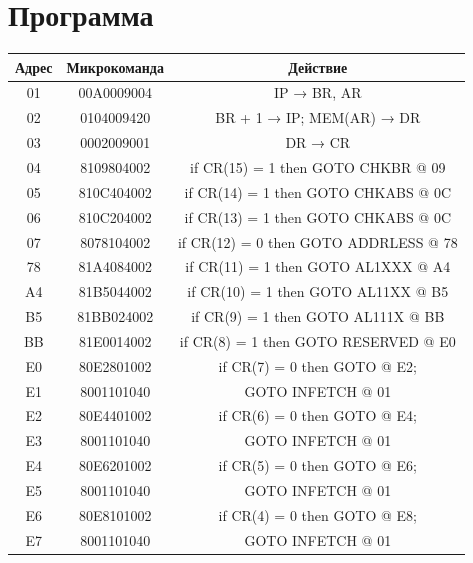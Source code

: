 \section{Программа}
\begin{center}
    \begin{tabular}{|c|c|c|}
        \hline
        Адрес   & Микрокоманда & Действие   \\
        \hline
        01  & 00A0009004    & IP → BR, AR   \\
        \hline
        02  & 0104009420    & BR + 1 → IP; MEM(AR) → DR \\
        \hline
        03  & 0002009001    & DR → CR   \\
        \hline
        04  & 8109804002    & if CR(15) = 1 then GOTO CHKBR @ 09    \\
        \hline
        05  & 810C404002    & if CR(14) = 1 then GOTO CHKABS @ 0C   \\
        \hline
        06  & 810C204002    & if CR(13) = 1 then GOTO CHKABS @ 0C   \\
        \hline
        07  & 8078104002    & if CR(12) = 0 then GOTO ADDRLESS @ 78 \\
        \hline
        78  & 81A4084002    & if CR(11) = 1 then GOTO AL1XXX @ A4   \\
        \hline
        A4  & 81B5044002    & if CR(10) = 1 then GOTO AL11XX @ B5   \\
        \hline
        B5  & 81BB024002    & if CR(9) = 1 then GOTO AL111X @ BB    \\
        \hline
        BB  & 81E0014002    & if CR(8) = 1 then GOTO RESERVED @ E0  \\
        \hline
        E0  & 80E2801002    & if CR(7) = 0 then GOTO @ E2; \\
        \hline
        E1  & 8001101040    & GOTO INFETCH @ 01 \\
        \hline
        E2  & 80E4401002    & if CR(6) = 0 then GOTO @ E4; \\
        \hline
        E3  & 8001101040    & GOTO INFETCH @ 01 \\
        \hline
        E4  & 80E6201002    & if CR(5) = 0 then GOTO @ E6; \\
        \hline
        E5  & 8001101040    & GOTO INFETCH @ 01 \\
        \hline
        E6  & 80E8101002    & if CR(4) = 0 then GOTO @ E8; \\
        \hline
        E7  & 8001101040    & GOTO INFETCH @ 01 \\

\end{tabular}
\end{center}

